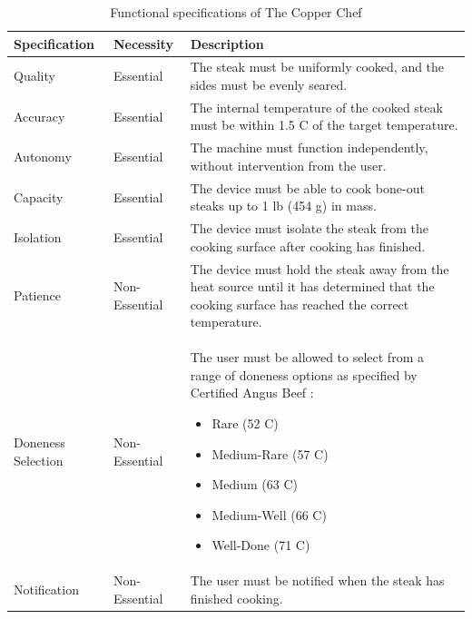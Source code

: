\documentclass[11pt]{article}
\begin{document}
\begin{table}[H]
\begin{tabularx}{\textwidth}{l l X}
	\hline

	Specification & Necessity & Description \\

	\hline

  Quality & Essential & The steak must be uniformly cooked, and the sides must be evenly seared. \\

	Accuracy & Essential & The internal temperature of the cooked steak must be within 1.5 \degree C of the target temperature. \\

	Autonomy & Essential & The machine must function independently, without intervention from the user. \\

	Capacity & Essential & The device must be able to cook bone-out steaks up to 1 lb (454 g) in mass. \\

  Isolation & Essential & The device must isolate the steak from the cooking surface after cooking has finished. \\

	Patience & Non-Essential & The device must hold the steak away from the heat source until it has determined that the cooking surface has reached the correct temperature. \\

	Doneness Selection & Non-Essential & The user must be allowed to select from a range of doneness options as specified by Certified Angus Beef \cite{doneness}:
  \begin{itemize}
		\item Rare (52 \degree C)
		\item Medium-Rare (57 \degree C)
		\item Medium (63 \degree C)
		\item Medium-Well (66 \degree C)
		\item Well-Done (71 \degree C)
	\end{itemize} \\ 

	Notification & Non-Essential & The user must be notified when the steak has finished cooking. \\

	\hline
\end{tabularx}
\caption{Functional specifications of The Copper Chef}
\label{table:func spec}
\end{table}
\end{document}
